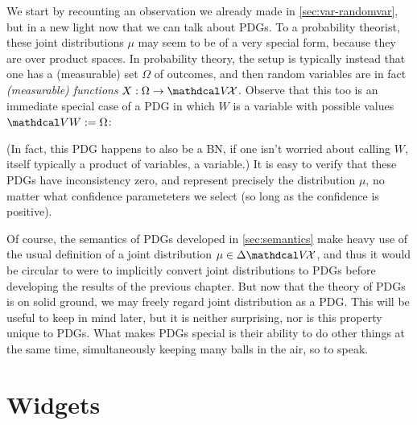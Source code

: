 We start by recounting an observation we already made in \cref{sec:var-randomvar},
    but in a new light now that we can talk about PDGs. 
To a probability theorist, these joint distributions $\mu$ may seem to be of a very special form, because they are over product spaces. 
In probability theory, the setup is typically instead that one has a (measurable) set $\Omega$ of outcomes, and then random variables are in fact \emph{(measurable) functions} $X : \Omega \to \V\!\X$. 
Observe that this too is an immediate special case of a PDG
in which $W$ is a variable with possible values $\V W := \Omega$:
%
\begin{center}
\end{center}
%
(In fact, this PDG happens to also be a BN, if one isn't worried about calling $W$, itself typically a product of variables, a variable.)
It is easy to verify that these PDGs have inconsistency zero, and represent precisely the distribution $\mu$, no matter what confidence parameteters we select (so long as the confidence is positive). 

Of course, the semantics of PDGs developed in \cref{sec:semantics}
make heavy use of the usual definition of a joint distribution $\mu \in \Delta \V\!\X$, and thus it would be circular to were to implicitly convert joint distributions to PDGs before developing the results of the previous chapter. 
But now that the theory of PDGs is on solid ground, we may freely regard joint distribution as a PDG. 
This will be useful to keep in mind later, 
    but it is neither surprising,
    nor is this property unique to PDGs. 
What makes PDGs special is their ability to do other things at the same time,
    simultaneously keeping many balls in the air, so to speak. 

\section{Widgets}


